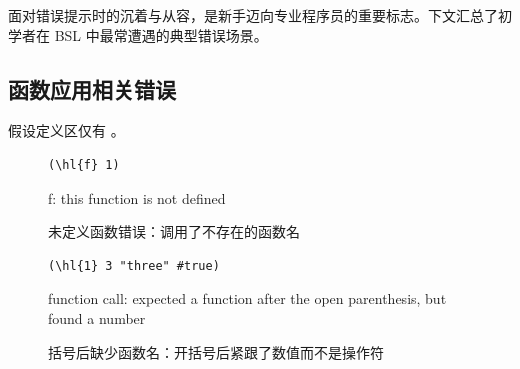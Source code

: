 \label{sec:int01_error_messages}

面对错误提示时的沉着与从容，是新手迈向专业程序员的重要标志。下文汇总了初学者在 BSL 中最常遭遇的典型错误场景。

\subsection{函数应用相关错误}

假设定义区仅有 。

\begin{figure}[htbp]
  \centering
\begin{stepperbox}[unbreakable]
\noindent\begin{minipage}[c]{0.46\linewidth}
\begin{Verbatim}[commandchars=\\\{\}, fontsize=\footnotesize]
(\hl{f} 1)
\end{Verbatim}
\end{minipage}\hfill
\begin{minipage}[c]{0.50\linewidth}\footnotesize\sffamily\raggedright
f: this function is not defined
\end{minipage}
\end{stepperbox}
  \caption{未定义函数错误：调用了不存在的函数名}
  \label{fig:err_undefined_fn}
\end{figure}

\begin{figure}[htbp]
  \centering
\begin{stepperbox}[unbreakable]
\noindent\begin{minipage}[c]{0.46\linewidth}
\begin{Verbatim}[commandchars=\\\{\}, fontsize=\footnotesize]
(\hl{1} 3 "three" #true)
\end{Verbatim}
\end{minipage}\hfill
\begin{minipage}[c]{0.50\linewidth}\footnotesize\sffamily\raggedright
function call: expected a function after the open parenthesis, but found a number
\end{minipage}
\end{stepperbox}
  \caption{括号后缺少函数名：开括号后紧跟了数值而不是操作符}
  \label{fig:err_expected_fn}
\end{figure}

